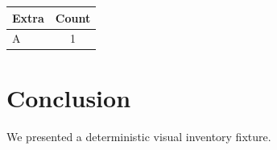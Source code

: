 \documentclass[10pt,twocolumn]{article}
\begin{document}
\begin{table}[h]
  \centering
  \begin{tabular}{lc}
    \hline
    Extra & Count \\
    \hline
    A & 1 \\
    \hline
  \end{tabular}
\end{table}



\section{Conclusion}
We presented a deterministic visual inventory fixture.
\end{document}
